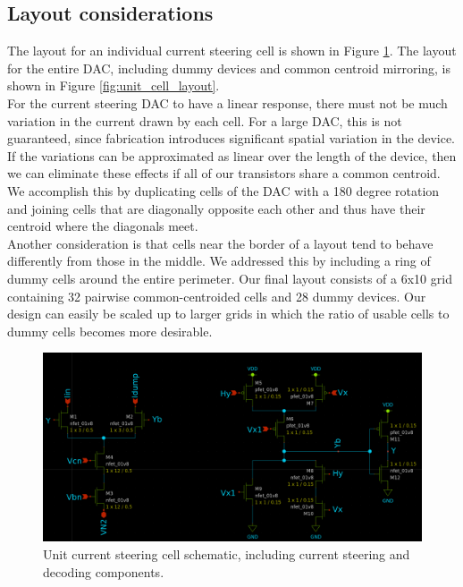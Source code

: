 \documentclass{article}
\begin{document}
\subsection{Layout considerations}
The layout for an individual current steering cell is shown in Figure \ref{fig:unit_cell_schematic}. The layout for the entire DAC, including dummy devices and common centroid mirroring, is shown in Figure \ref{fig:unit_cell_layout}.\\

For the current steering DAC to have a linear response, there must not be much variation in the current drawn by each cell. For a large DAC, this is not guaranteed, since fabrication introduces significant spatial variation in the device. If the variations can be approximated as linear over the length of the device, then we can eliminate these effects if all of our transistors share a common centroid. We accomplish this by duplicating cells of the DAC with a 180 degree rotation and joining cells that are diagonally opposite each other and thus have their centroid where the diagonals meet.\\

Another consideration is that cells near the border of a layout tend to behave differently from those in the middle. We addressed this by including a ring of dummy cells around the entire perimeter. Our final layout consists of a 6x10 grid containing 32 pairwise common-centroided cells and 28 dummy devices. Our design can easily be scaled up to larger grids in which the ratio of usable cells to dummy cells becomes more desirable.\\

\begin{figure}[H]
    \centering{}
    \includegraphics[width=0.7\columnwidth]{images/unit_cell_schematic.png}
    \caption{Unit current steering cell schematic, including current steering and decoding components.}
    \label{fig:unit_cell_schematic}
\end{figure}
\end{document}

